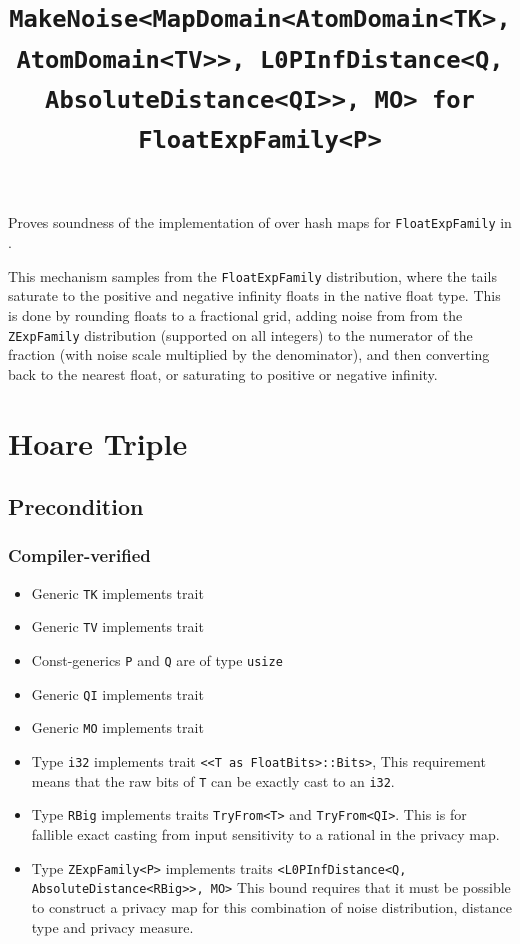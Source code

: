 \documentclass{article}
\title{\texttt{MakeNoise<MapDomain<AtomDomain<TK>, AtomDomain<TV>>, L0PInfDistance<Q, AbsoluteDistance<QI>>, MO> for FloatExpFamily<P>}}
\author{\MichaelShoemateAuthor}
\date{}
\begin{document}
\maketitle

\contrib
Proves soundness of the implementation of  over hash maps
for \texttt{FloatExpFamily} in .

This mechanism samples from the \texttt{FloatExpFamily} distribution,
where the tails saturate to the positive and negative infinity floats in the native float type.
This is done by rounding floats to a fractional grid,
adding noise from from the \texttt{ZExpFamily} distribution (supported on all integers)
to the numerator of the fraction (with noise scale multiplied by the denominator),
and then converting back to the nearest float, or saturating to positive or negative infinity.

\section{Hoare Triple}
\subsection*{Precondition}
\subsubsection*{Compiler-verified}

\begin{itemize}
    \item Generic \texttt{TK} implements trait 
    \item Generic \texttt{TV} implements trait 
    \item Const-generics \texttt{P} and \texttt{Q} are of type \texttt{usize}
    \item Generic \texttt{QI} implements trait 
    \item Generic \texttt{MO} implements trait 
    \item Type \texttt{i32} implements trait \texttt{<<T as FloatBits>::Bits>},
        This requirement means that the raw bits of \texttt{T} can be exactly cast to an \texttt{i32}.
    \item Type \texttt{RBig} implements traits \texttt{TryFrom<T>} and \texttt{TryFrom<QI>}.
        This is for fallible exact casting from input sensitivity to a rational in the privacy map.
    \item Type \texttt{ZExpFamily<P>} implements traits \texttt{<L0PInfDistance<Q, AbsoluteDistance<RBig>>, MO>}
        This bound requires that it must be possible to construct a privacy map for this combination of noise distribution, distance type and privacy measure.
\end{itemize}
\end{document}
